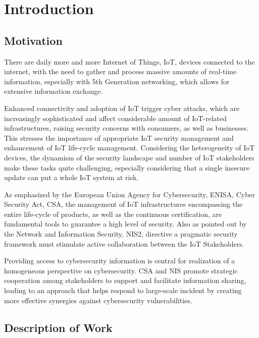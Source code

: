 \chapter{Introduction}

\section{Motivation}

There are daily more and more Internet of Things, IoT, devices connected to the internet, with the need to gather and
process massive amounts of real-time information, especially with 5th Generation networking, which allows for extensive
information exchange.

Enhanced connectivity and adoption of IoT trigger cyber attacks, which are increasingly sophisticated and affect
considerable amount of IoT-related infrastructures, raising security concerns with consumers, as well as businesses.
This stresses the importance of appropriate IoT security management and enhancement of IoT life-cycle management.
Considering the heterogeneity of IoT devices, the dynamism of the security landscape and number of IoT stakeholders make
these tasks quite challenging, especially considering that a single insecure update can put a whole IoT system at
risk.

As emphasized by the European Union Agency for Cybersecurity, ENISA, Cyber Security Act, CSA, the management of IoT
infrastructures encompassing the entire life-cycle of products, as well as the continuous certification, are fundamental
tools to guarantee a high level of security. \cite{EU-cybersecurity-act}
Also as pointed out by the Network and Information Security, NIS2, directive a pragmatic security framework must
stimulate active collaboration between the IoT Stakeholders. \cite{EU-nis2-directive}

Providing access to cybersecurity information is central for realization of a homogeneous perspective on cybersecurity.
CSA and NIS promote strategic cooperation among stakeholders to support and facilitate information sharing, leading to
an approach that helps respond to large-scale incident by creating more effective synergies against cybersecurity
vulnerabilities.

\section{Description of Work}

